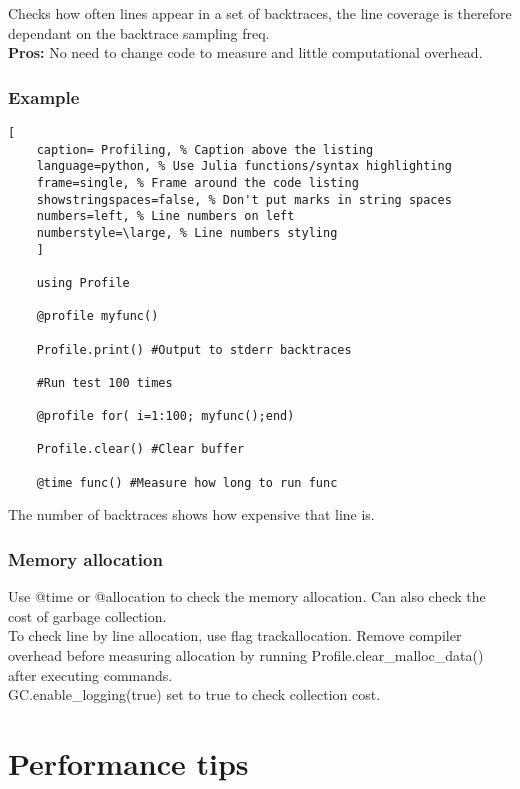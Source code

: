 \documentclass[11pt]{scrartcl} %
\begin{document}
Checks how often lines appear in a set of backtraces, the line coverage is therefore dependant on
the backtrace sampling freq.\\

\textbf{Pros:} No need to change code to measure and little computational overhead.

\subsubsection{Example}

\begin{lstlisting}[
	caption= Profiling, % Caption above the listing
	language=python, % Use Julia functions/syntax highlighting
	frame=single, % Frame around the code listing
	showstringspaces=false, % Don't put marks in string spaces
	numbers=left, % Line numbers on left
	numberstyle=\large, % Line numbers styling
	]

	using Profile

	@profile myfunc()

	Profile.print() #Output to stderr backtraces

	#Run test 100 times

	@profile for( i=1:100; myfunc();end)

	Profile.clear() #Clear buffer

	@time func() #Measure how long to run func

\end{lstlisting}

The number of backtraces shows how expensive that line is. 

\subsubsection{Memory allocation}

Use @time or @allocation to check the memory allocation. Can also check the
cost of garbage collection.\\

To check line by line allocation, use flag track\-allocation. Remove compiler
overhead before measuring allocation by running Profile.clear\_malloc\_data() after
executing commands.\\

GC.enable\_logging(true) set to true to check collection cost.

\newpage
\section{Performance tips}
\end{document}
